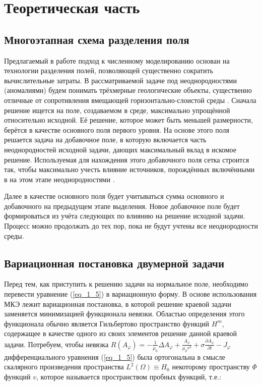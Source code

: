 \chapter{Теоретическая часть}

\section{Многоэтапная схема разделения поля}


Предлагаемый в работе подход к численному моделированию основан на технологии разделения полей, позволяющей существенно сократить вычислительные затраты. В рассматриваемой задаче под неоднородностями (аномалиями) будем понимать трёхмерные геологические объекты, существенно отличные от сопротивления вмещающей горизонтально-слоистой среды \cite{6}. Сначала решение ищется на поле, создаваемом в среде, максимально упрощённой относительно исходной. Её решение, которое может быть меньшей размерности, берётся в качестве основного поля первого уровня. На основе этого поля решается задача на добавочное поле, в которую включается часть неоднородностей исходной задачи, дающих максимальный вклад в искомое решение. Используемая для нахождения этого добавочного поля сетка строится так, чтобы максимально учесть влияние источников, порождённых включёнными в на этом этапе неоднородностями \cite{7}.

Далее в качестве основного поля будет учитываться сумма основного и добавочного на предыдущем этапе выделения. Новое добавочное поле будет формироваться из учёта следующих по влиянию на решение исходной задачи. Процесс можно продолжать до тех пор, пока не будут учтены все неоднородности среды.

\section{Вариационная постановка двумерной задачи}

Перед тем, как приступить к решению задачи на нормальное поле, необходимо перевести уравнение (\ref{eq_1_5}) в вариационную форму. В основе использования МКЭ лежит вариационная постановка, в которой решение краевой задачи заменяется минимизацией функционала невязки. Областью определения этого функционала обычно является Гильбертово пространство функций $H^m$, содержащее в качестве одного из своих элементов решение данной краевой задачи. Потребуем, чтобы невязка $R(A_{\varphi}) = -\frac{1}{\mu_0} \Delta A_{\varphi} + \frac{A_{\varphi}}{\mu_0 r^2} + \sigma \frac{\partial A_{\varphi}}{\partial t} - J_{\varphi}$ дифференциального уравнения (\ref{eq_1_5}) была ортогональна в смысле скалярного произведения пространства $L^2(\Omega) \equiv H_0$ некоторому пространству $\Phi$ функций $v$, которое называется пространством пробных функций, т.е.:

